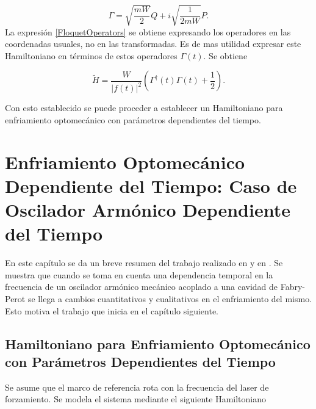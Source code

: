 \documentclass[10pt,a4paper]{report}
\begin{document}
\begin{equation}
\Gamma = \sqrt{\frac{mW}{2}}Q + i \sqrt{\frac{1}{2mW}}P.
\end{equation} La expresión \eqref{FloquetOperators} se obtiene expresando los operadores en las coordenadas usuales, no en las transformadas. Es de mas utilidad expresar este Hamiltoniano en términos de estos operadores $\Gamma(t)$. Se obtiene

\begin{equation}
\tilde{H} = \frac{W}{|f(t)|^2}(\Gamma^\dagger(t)\Gamma(t) + \frac{1}{2}).
\end{equation}

Con esto establecido se puede proceder a establecer un Hamiltoniano para enfriamiento optomecánico con parámetros dependientes del tiempo.



\chapter{Enfriamiento Optomecánico Dependiente del Tiempo: Caso de Oscilador Armónico Dependiente del Tiempo}

En este capítulo se da un breve resumen del trabajo realizado en \cite{TesisMaestria} y en \cite{YanesOC}. Se muestra que  cuando se toma en cuenta una dependencia temporal en la frecuencia  de un oscilador armónico mecánico acoplado a una cavidad de Fabry-Perot se llega a cambios cuantitativos y cualitativos en el enfriamiento del mismo. Esto motiva el trabajo que inicia en el capítulo siguiente.


\section{Hamiltoniano para Enfriamiento Optomecánico con Parámetros Dependientes del Tiempo}

 Se asume que el marco de referencia rota con la frecuencia del laser de forzamiento. Se modela el sistema mediante el siguiente Hamiltoniano\cite{BarberisLC}
\end{document}
